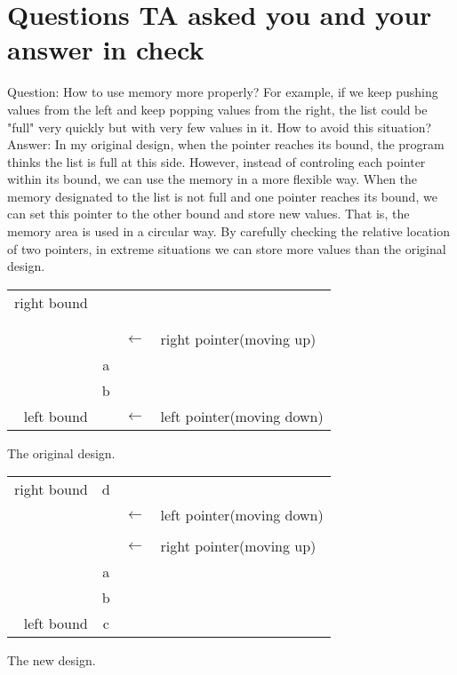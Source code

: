 \documentclass[a4paper, 12pt]{article}
\begin{document}
\section{Questions TA asked you and your answer in check}
\noindent
Question: How to use memory more properly? For example, if we keep pushing values from the left and keep popping values from the right, the list could be "full" very quickly but with very few values in it. How to avoid this situation?\\
Answer: In my original design, when the pointer reaches its bound, the program thinks the list is full at this side. However, instead of controling each pointer within its bound, we can use the memory in a more flexible way. When the memory designated to the list is not full and one pointer reaches its bound, we can set this pointer to the other bound and store new values. That is, the memory area is used in a circular way. By carefully checking the relative location of two pointers, in extreme situations we can store more values than the original design. \\
\begin{minipage}[h]{\textwidth}
  \begin{minipage}[t]{0.45\textwidth}
    \centering
    \makeatletter{}
    \begin{tabular}{r|c|c@{}l}
      \cline{2-2}
      right bound & & \\
      \cline{2-2}
                  & & \\
      \cline{2-2}
                  & & \\
      \cline{2-2}
                  &   & $\leftarrow$ & {\footnotesize right pointer(moving up)}\\
      \cline{2-2}
                  & a \\
      \cline{2-2}
                  & b \\
      \cline{2-2}
      left bound  &  & $\leftarrow$ & {\footnotesize left pointer(moving down)}\\
      \cline{2-2}
    \end{tabular}
    \caption{The original design.}
  \end{minipage}
  \begin{minipage}[t]{0.45\textwidth}
    \centering
    \makeatletter{}
    \begin{tabular}{r|c|c@{}l}
      \cline{2-2}
      right bound & d & \\
      \cline{2-2}
                  &   & $\leftarrow$ & {\footnotesize left pointer(moving down)}\\
      \cline{2-2}
                  &   & \\
      \cline{2-2}
                  &   & $\leftarrow$ & {\footnotesize right pointer(moving up)}\\
      \cline{2-2}
                  & a \\
      \cline{2-2}
                  & b \\
      \cline{2-2}
      left bound  & c \\
      \cline{2-2}
    \end{tabular}
    \caption{The new design.}
  \end{minipage}
\end{minipage}
\end{document}
